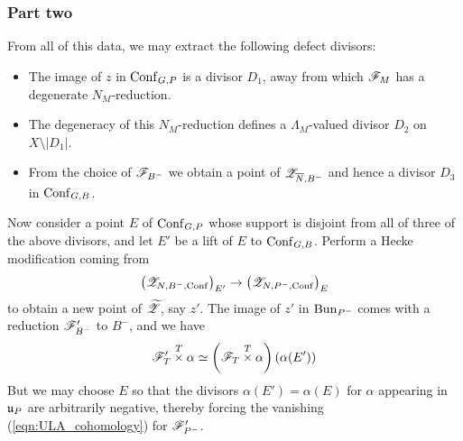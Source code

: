 \subsubsection{Part two} From all of this data, we may extract the following defect divisors:
\begin{itemize}
    \item The image of $z$ in $\mathrm{Conf}_{G,P}$ is a divisor $D_1$, away from which $\mathscr{F}_M$ has a degenerate $N_M$-reduction.
    \item The degeneracy of this $N_M$-reduction defines a $\Lambda_M$-valued divisor $D_2$ on $X \setminus |D_1|$.
    \item From the choice of $\mathscr{F}_{B^-}$ we obtain a point of $\mathscr{Z}_{\overline{N},B^-}$ and hence a divisor $D_3$ in $\mathrm{Conf}_{G,B}$. 
\end{itemize}
Now consider a point $E$ of $\mathrm{Conf}_{G,P}$ whose support is disjoint from all of three of the above divisors, and let $E'$ be a lift of $E$ to $\mathrm{Conf}_{G,B}$. Perform a Hecke modification coming from
    \[
    \left(\mathscr{Z}_{N,B^-,\mathrm{Conf}}\right)_{E'} \to \left(\mathscr{Z}_{N,P^-,\mathrm{Conf}}\right)_E\]
to obtain a new point of ${\widetilde{\mathscr{Z}}}$, say $z'$. The image of $z'$ in $\mathrm{Bun}_{P^-}$ comes with a reduction $\mathscr{F}_{B^-}'$ to $B^-$, and we have
  \[\mathscr{F}_T' \overset{T}{\times} \alpha \simeq \left(\mathscr{F}_T \overset{T}{\times} \alpha \right)(\alpha(E'))\]
But we may choose $E$ so that the divisors $\alpha(E') = \alpha(E)$ for $\alpha$ appearing in $\mathfrak{u}_P$ are arbitrarily negative, thereby forcing the vanishing (\ref{eqn:ULA_cohomology}) for $\mathscr{F}_{P^-}'$.